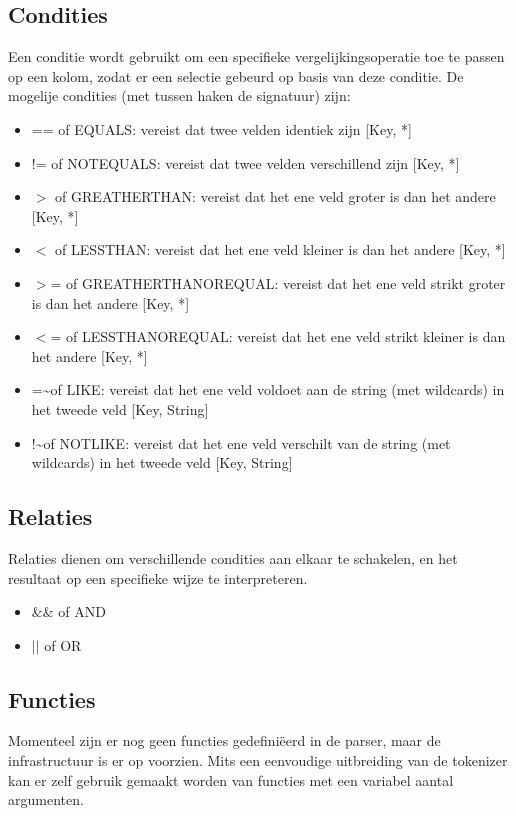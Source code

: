 \subsection{Condities}

Een conditie wordt gebruikt om een specifieke vergelijkingsoperatie toe te passen op een kolom, zodat er een selectie gebeurd op basis van deze conditie. De mogelije condities (met tussen haken de signatuur) zijn:

\begin{itemize}
\item == of EQUALS: vereist dat twee velden identiek zijn [Key, *]
\item != of NOTEQUALS: vereist dat twee velden verschillend zijn [Key, *]
\item $>$ of GREATHERTHAN: vereist dat het ene veld groter is dan het andere [Key, *]
\item $<$ of LESSTHAN: vereist dat het ene veld kleiner is dan het andere [Key, *]
\item $>$= of GREATHERTHANOREQUAL: vereist dat het ene veld strikt groter is dan het andere [Key, *]
\item $<$= of LESSTHANOREQUAL: vereist dat het ene veld strikt kleiner is dan het andere [Key, *]
\item =\textasciitilde of LIKE: vereist dat het ene veld voldoet aan de string (met wildcards) in het tweede veld [Key, String]
\item !\textasciitilde of NOTLIKE: vereist dat het ene veld verschilt van de string (met wildcards) in het tweede veld [Key, String]
\end{itemize}

\subsection{Relaties}

Relaties dienen om verschillende condities aan elkaar te schakelen, en het resultaat op een specifieke wijze te interpreteren.

\begin{itemize}
\item \&\& of AND
\item $||$ of OR
\end{itemize}

\subsection{Functies}

Momenteel zijn er nog geen functies gedefini\"eerd in de parser, maar de infrastructuur is er op voorzien. Mits een eenvoudige uitbreiding van de tokenizer kan er zelf gebruik gemaakt worden van functies met een variabel aantal argumenten.


